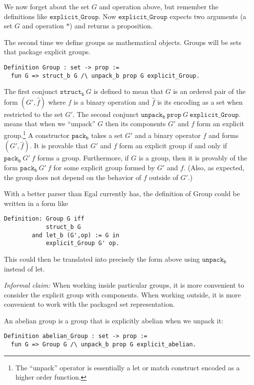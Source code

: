 \documentclass{article}
\begin{document}
We now forget about the set $G$ and operation above, but
remember the definitions like ${\mathtt{explicit\_Group}}$.
Now ${\mathtt{explicit\_Group}}$ expects two arguments (a set $G$ and operation $*$) and
returns a proposition.

The second time we define groups as mathematical objects.
Groups will be sets that package explicit groups.
\begin{verbatim}
Definition Group : set -> prop :=
  fun G => struct_b G /\ unpack_b prop G explicit_Group.
\end{verbatim}
The first conjunct $\mathtt{struct_b}~G$ is defined to mean
that $G$ is an ordered pair of the form $(G',\hat{f})$ where $f$ is a
binary operation and $\hat{f}$ is its encoding as a set when restricted to the set $G'$.
The second conjunct $\mathtt{unpack_b}~\mathtt{prop}~G~\mathtt{explicit\_Group}$.
means that when we ``unpack'' $G$ then its components $G'$ and $f$
form an explicit group.\footnote{The ``unpack'' operator is essentially a let or match construct encoded as a higher order function.}
A constructor $\mathtt{pack_b}$ takes a set $G'$ and a binary operator $f$ and forms $(G',\hat{f})$.
It is provable that $G'$ and $f$ form an explicit group if and only if $\mathtt{pack_b}~G'~f$
forms a group. Furthermore, if $G$ is a group, then it is provably of the form $\mathtt{pack_b}~G'~f$
for some explicit group formed by $G'$ and $f$. (Also, as expected, the group does not depend on the
behavior of $f$ outside of $G'$.)

With a better parser than Egal currently has, the definition of Group could be written
in a form like
\begin{verbatim}
Definition: Group G iff
            struct_b G
        and let_b (G',op) := G in
            explicit_Group G' op.
\end{verbatim}
This could then be translated into precisely the form above using ${\mathtt{unpack_b}}$ instead of let.

{\it{Informal claim:}} When working inside particular groups, it is
more convenient to consider the explicit group with components. When
working outside, it is more convenient to work with the packaged set
representation.

An abelian group is a group that is explicitly abelian when we unpack it:
\begin{verbatim}
Definition abelian_Group : set -> prop :=
  fun G => Group G /\ unpack_b prop G explicit_abelian.
\end{verbatim}
\end{document}
